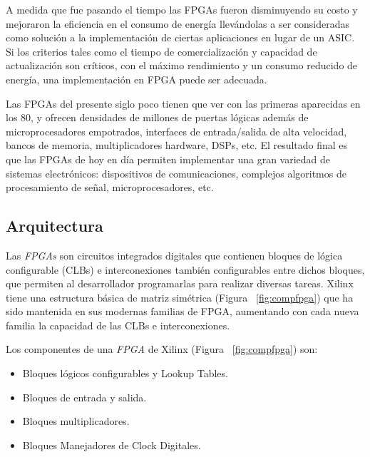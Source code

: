 	\par
	A medida que fue pasando el tiempo las FPGAs fueron disminuyendo su costo y mejoraron la eficiencia en el consumo de energía llevándolas a ser
	consideradas como solución a la implementación de ciertas aplicaciones en lugar de un ASIC. Si los criterios tales como el tiempo de
	comercialización y capacidad de actualización son críticos, con el máximo rendimiento y un consumo reducido de energía, una implementación en FPGA
	puede ser adecuada.
	\vspace{0.5cm}
	\par
	Las FPGAs del presente siglo poco tienen que ver con las primeras aparecidas en los 80, y ofrecen densidades de millones de puertas lógicas además
	de microprocesadores empotrados, interfaces de entrada/salida de alta velocidad, bancos de memoria, multiplicadores hardware, DSPs, etc. El
	resultado final es que las FPGAs de hoy en día permiten implementar una gran variedad de sistemas electrónicos: dispositivos de comunicaciones,
	complejos algoritmos de procesamiento de señal, microprocesadores, etc.

	\subsection{Arquitectura}
    \par
	Las \textit{FPGAs} son circuitos integrados digitales que contienen bloques de lógica configurable (CLBs) e interconexiones también configurables entre dichos
	bloques, que permiten al desarrollador programarlas para realizar diversas tareas. Xilinx tiene una estructura básica de matriz simétrica (Figura
	~\ref{fig:compfpga}) que ha sido mantenida en sus modernas familias de FPGA, aumentando con cada nueva familia la capacidad de las CLBs e
	interconexiones.
	\vspace{0.5cm}
	\par
	Los componentes de una \textit{FPGA} de Xilinx (Figura ~\ref{fig:compfpga}) son:

	\begin {itemize}
	\item  Bloques lógicos configurables y Lookup Tables.
	\item  Bloques de entrada y salida.
	\item  Bloques multiplicadores.
	\item  Bloques Manejadores de Clock Digitales.
	\end {itemize}

